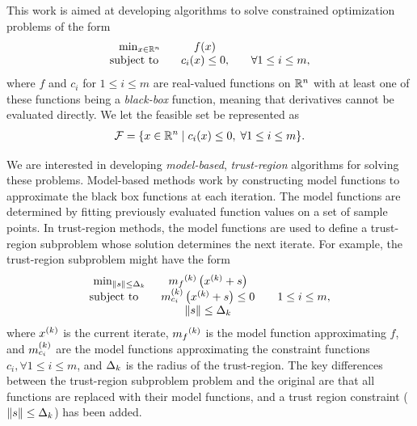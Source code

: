 \documentclass{article}
\begin{document}
This work is aimed at developing algorithms to solve constrained optimization problems of the form 
\begin{align}
\begin{array}{ccl} \min_{x \in \mathbb R^n} & f(x) \\
\mbox{subject to} \quad & c_i(x) \le 0, &\quad \forall 1 \le i \le m,
\end{array}
\label{the_dfo_problem}
\end{align}
where 
$f$ and $c_i$ for $1 \le i \le m$ are real-valued functions on $\mathbb R^n$ with at least one of these functions being a {\em black-box} function, meaning that derivatives cannot be evaluated directly.
We let the feasible set be represented as
\begin{align}
{\mathcal F} = \{x \in \mathbb R^n \; | \; c_i(x) \le 0, \; \forall 1 \le i \le m \}.
\end{align}

We are interested in developing {\em model-based}, {\em trust-region} algorithms for solving these problems.
Model-based methods work by constructing model functions to approximate the black box functions at each iteration.
The model functions are determined by fitting previously evaluated function values on a set of sample points.
In trust-region methods, the model functions are used to define a trust-region subproblem whose solution determines the next iterate.
For example, the trust-region subproblem might have the form
\begin{align*}
\begin{array}{ccl} \min_{\|s\| \le \Delta_k}
 & {{m}_f}^{(k)} \left(x^{(k)}+s\right) \\
\mbox{subject to} \quad & {{m}^{(k)}_{c_i}}\left(x^{(k)} + s\right) \le 0 & \quad 1 \le i \le m, \\
& \|s\| \le \Delta_k \\
\end{array}
\end{align*}
where $x^{(k)}$ is the current iterate, ${{m}_f}^{(k)}$ is the model function approximating $f$, 
and ${{m}^{(k)}_{c_i}}$ are the model functions approximating the constraint functions $c_i, \forall 1 \le i \le m$, and $\Delta_k$ is the radius of the trust-region.
The key differences between the trust-region subproblem problem and the original are that all functions are replaced with their model functions, 
and a trust region constraint ($\|s\| \le \Delta_k$) has been added.

\end{document}
